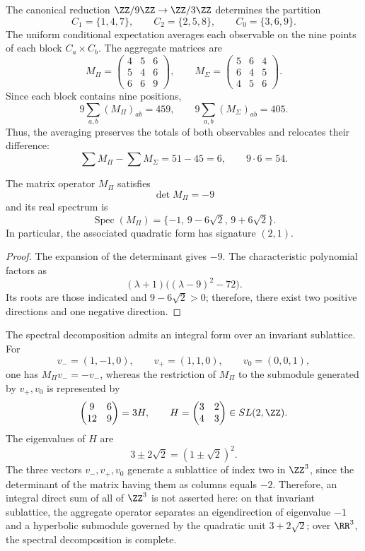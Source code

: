 The canonical reduction
\(\ZZ/9\ZZ\to\ZZ/3\ZZ\) determines the partition
\[
 C_1=\{1,4,7\},\qquad
 C_2=\{2,5,8\},\qquad
 C_0=\{3,6,9\}.
\]
The uniform conditional expectation averages each observable on the nine points of each block
\(C_a\times C_b\). The aggregate matrices are
\[
 M_{\Pi}=
 \begin{pmatrix}4&5&6\\5&4&6\\6&6&9\end{pmatrix},
 \qquad
 M_{\Sigma}=
 \begin{pmatrix}5&6&4\\6&4&5\\4&5&6\end{pmatrix}.
\]
Since each block contains nine positions,
\[
 9\sum_{a,b}(M_\Pi)_{ab}=459,\qquad
 9\sum_{a,b}(M_\Sigma)_{ab}=405.
\]
Thus, the averaging preserves the totals of both observables and relocates their difference:
\[
 \sum M_\Pi-\sum M_\Sigma=51-45=6,\qquad 9\cdot6=54.
\]

\begin{theorem}
\label{thm:app-espectro-agregado}
The matrix operator \(M_\Pi\) satisfies
\[
 \det M_\Pi=-9
\]
and its real spectrum is
\[
 \operatorname{Spec}(M_\Pi)
 =\{-1,\,9-6\sqrt2,\,9+6\sqrt2\}.
\]
In particular, the associated quadratic form has signature \((2,1)\).
\end{theorem}

\begin{proof}
The expansion of the determinant gives \(-9\). The characteristic polynomial
factors as
\[
 (\lambda+1)\bigl((\lambda-9)^2-72\bigr).
\]
Its roots are those indicated and \(9-6\sqrt2>0\); therefore, there exist two
positive directions and one negative direction.
\end{proof}

The spectral decomposition admits an integral form over an invariant sublattice. For
\[
 v_-=(1,-1,0),\qquad v_+=(1,1,0),\qquad v_0=(0,0,1),
\]
one has \(M_\Pi v_-=-v_-\), whereas the restriction of \(M_\Pi\) to the
submodule generated by \(v_+,v_0\) is represented by
\[
 \begin{pmatrix}9&6\\12&9\end{pmatrix}
 =3H,\qquad
 H=\begin{pmatrix}3&2\\4&3\end{pmatrix}\in SL(2,\ZZ).
\]
The eigenvalues of \(H\) are
\[
 3\pm2\sqrt2=(1\pm\sqrt2)^2.
\]
The three vectors \(v_-,v_+,v_0\) generate a sublattice of index two in
\(\ZZ^3\), since the determinant of the matrix having them as columns equals
\(-2\). Therefore, an integral direct sum of all of
\(\ZZ^3\) is not asserted here: on that invariant sublattice, the aggregate operator separates an
eigendirection of eigenvalue \(-1\) and a hyperbolic submodule governed by the
quadratic unit \(3+2\sqrt2\); over \(\RR^3\), the spectral decomposition
is complete.


